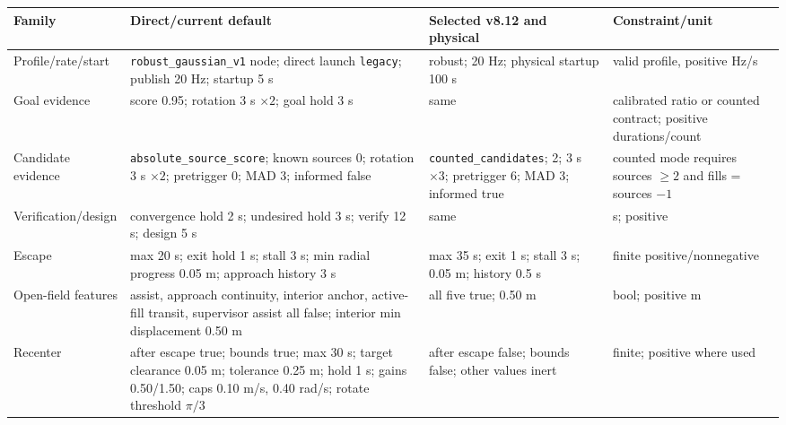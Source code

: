 \documentclass[
  10pt,
  letterpaper,
]{article}
\newcounter{none} %
\begin{document}
{\def\LTcaptype{none} %
\begin{longtable}[]{@{}
  >{\raggedright\arraybackslash}p{}
  >{\raggedright\arraybackslash}p{}
  >{\raggedright\arraybackslash}p{}
  >{\raggedright\arraybackslash}p{}@{}}
\toprule\noalign{}
\begin{minipage}[b]{\linewidth}\raggedright
Family
\end{minipage} & \begin{minipage}[b]{\linewidth}\raggedright
Direct/current default
\end{minipage} & \begin{minipage}[b]{\linewidth}\raggedright
Selected v8.12 and physical
\end{minipage} & \begin{minipage}[b]{\linewidth}\raggedright
Constraint/unit
\end{minipage} \\
\midrule\noalign{}
\endhead
\bottomrule\noalign{}
\endlastfoot
Profile/rate/start & \nolinkurl{robust\_gaussian\_v1} node; direct launch \nolinkurl{legacy}; publish 20 Hz; startup 5 s & robust; 20 Hz; physical startup 100 s & valid profile, positive Hz/s \\
Goal evidence & score 0.95; rotation 3 s $\times 2$; goal hold 3 s & same & calibrated ratio or counted contract; positive durations/count \\
Candidate evidence & \nolinkurl{absolute\_source\_score}; known sources 0; rotation 3 s $\times 2$; pretrigger 0; MAD 3; informed false & \nolinkurl{counted\_candidates}; 2; 3 s $\times 3$; pretrigger 6; MAD 3; informed true & counted mode requires sources $\geq 2$ and fills = sources $-1$ \\
Verification/design & convergence hold 2 s; undesired hold 3 s; verify 12 s; design 5 s & same & s; positive \\
Escape & max 20 s; exit hold 1 s; stall 3 s; min radial progress 0.05 m; approach history 3 s & max 35 s; exit 1 s; stall 3 s; 0.05 m; history 0.5 s & finite positive/nonnegative \\
Open-field features & assist, approach continuity, interior anchor, active-fill transit, supervisor assist all false; interior min displacement 0.50 m & all five true; 0.50 m & bool; positive m \\
Recenter & after escape true; bounds true; max 30 s; target clearance 0.05 m; tolerance 0.25 m; hold 1 s; gains 0.50/1.50; caps 0.10 m/s, 0.40 rad/s; rotate threshold $\pi/3$ & after escape false; bounds false; other values inert & finite; positive where used \\

\end{longtable}}
\end{document}
